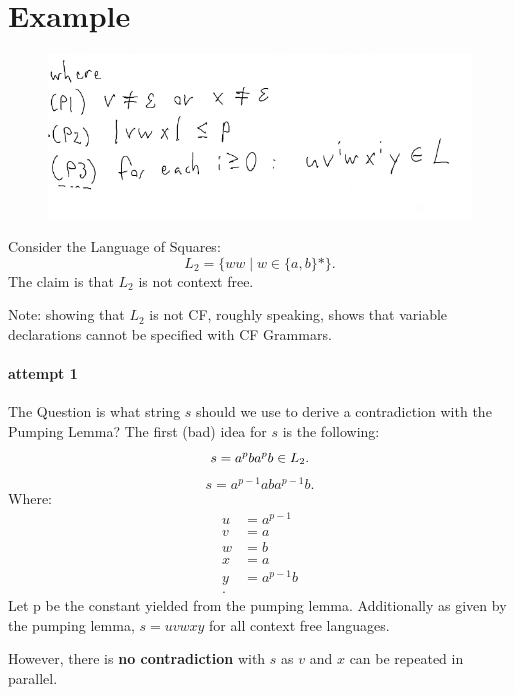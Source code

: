 \documentclass[12pt]{book}
\title{\coursetitle\linebreak\lecturename}
\author{\\Cain Susko\\ 
           \\ \\ \\
      Queen's University 
    \\School of Computing\\}
\begin{document}
\begin{titlepage}
        \maketitle
\end{titlepage}


\section*{Example}

\begin{figure}[h]
        \centering
        \includegraphics{./figures/pumpingLemma.png}
\end{figure}
Consider the Language of Squares:
\[
L_2 = \{ww \mid w\in\{a,b\}*\}
.\] 
The claim is that $L_2$ is not context free.

Note: showing that $L_2$ is not CF, roughly speaking, shows that variable declarations
cannot be specified with CF Grammars.
\paragraph{attempt 1}
The Question is what string $s$ should we use to derive a contradiction with the 
Pumping Lemma? The first (bad) idea for $s$ is the following:
 \[
s = a^pba^pb\in L_2\\
.\] 
\[
s = a^{p-1}aba^{p-1}b
.\] 
Where:
\begin{align*}
        u &= a^{p-1} \\
        v &= a \\
        w &= b \\
        x &= a \\
        y &= a^{p-1}b \\
.\end{align*}
Let p be the constant yielded from the pumping lemma.
Additionally as given by the pumping lemma, $s = uvwxy$ for all context 
free languages.

However, there is \textbf{no contradiction} with $s$ as  $v$ and
$x$ can be repeated in parallel.
\end{document}
